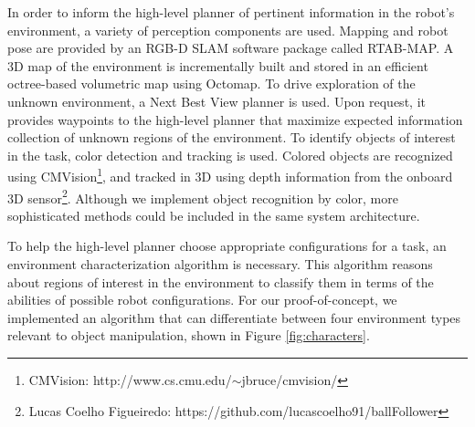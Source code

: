 \documentclass[conference]{IEEEtran}
\begin{document}

In order to inform the high-level planner of pertinent information in the robot's environment, a variety of perception components are used. Mapping and robot pose are provided by an RGB-D SLAM software package called RTAB-MAP\cite{rtabmap}. A 3D map of the environment is incrementally built and stored in an efficient octree-based volumetric map using Octomap\cite{octomap}. To drive exploration of the unknown environment, a Next Best View planner \cite{Daudelin2017} is used. Upon request, it provides waypoints to the high-level planner that maximize expected information collection of unknown regions of the environment. To identify objects of interest in the task, color detection and tracking is used.  Colored objects are recognized using CMVision\footnote{CMVision: http://www.cs.cmu.edu/$\sim$jbruce/cmvision/}, and tracked in 3D using depth information from the onboard 3D sensor\footnote{Lucas Coelho Figueiredo: https://github.com/lucascoelho91/ballFollower}. Although we implement object recognition by color, more sophisticated methods could be included in the same system architecture.

To help the high-level planner choose appropriate configurations for a task, an environment characterization algorithm is necessary. This algorithm reasons about regions of interest in the environment to classify them in terms of the abilities of possible robot configurations. For our proof-of-concept, we implemented an algorithm that can differentiate between four environment types relevant to object manipulation, shown in Figure \ref{fig:characters}. 
\end{document}
